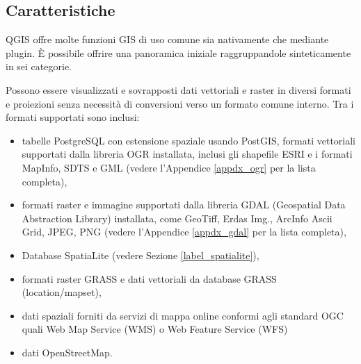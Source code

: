 \subsection{Caratteristiche}\label{label_majfeat}

QGIS offre molte funzioni GIS di uso comune sia nativamente che mediante plugin. È possibile offrire
una panoramica iniziale raggruppandole sinteticamente
in sei categorie.


Possono essere visualizzati e sovrapposti dati vettoriali e raster
in diversi formati e proiezioni senza necessità di conversioni verso un formato
comune interno. Tra i formati supportati sono inclusi:

\begin{itemize}
\item tabelle PostgreSQL con estensione spaziale usando PostGIS, formati vettoriali
supportati dalla libreria OGR installata, inclusi gli
shapefile ESRI e i formati MapInfo, SDTS e GML (vedere l'Appendice \ref{appdx_ogr} per la lista completa),
\item formati raster e immagine supportati dalla libreria GDAL (Geospatial
Data Abstraction Library) installata, come GeoTiff, Erdas Img., ArcInfo
Ascii Grid, JPEG, PNG (vedere l'Appendice \ref{appdx_gdal} per la lista completa),
\item Database SpatiaLite (vedere Sezione \ref{label_spatialite}),
\item formati raster GRASS e dati vettoriali da database GRASS (location/mapset), 
\item dati spaziali forniti da servizi di mappa online conformi agli standard
OGC quali Web Map Service (WMS) o Web Feature Service (WFS)
\item dati OpenStreetMap.
\end{itemize}


